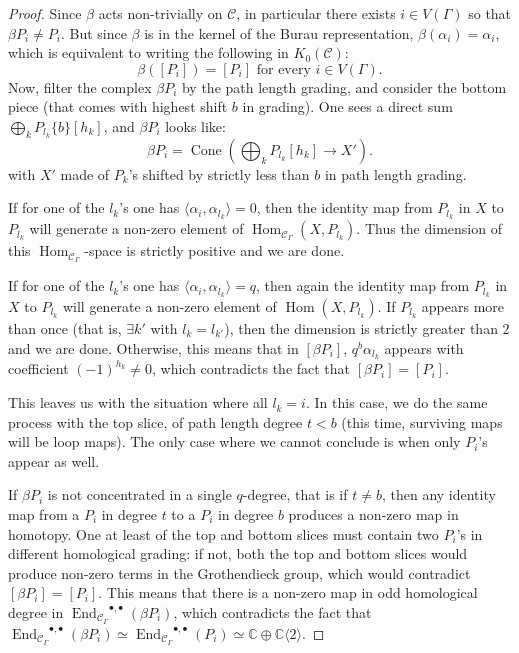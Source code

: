 \documentclass[a4paper]{amsart}
\newcommand{\C}{\mathbb{C}}
\newcommand{\0}{\mathbf{0}}
\newcommand{\calC}{\mathcal{C}}
\DeclareMathOperator{\Cone}{Cone}
\DeclareMathOperator{\Hom}{Hom}
\DeclareMathOperator{\End}{End}
\newcommand{\HOM}{\ensuremath{\Hom_{\mathcal{C}_\Gamma}}}
\newcommand{\END}{\ensuremath{\End_{\mathcal{C}_{\Gamma}}}}
\theoremstyle{theorem}
\begin{document}
\begin{proof}
  Since $\beta$ acts non-trivially on $\calC$, in particular there exists $i\in V(\Gamma)$ so that $\beta P_i\neq P_i$. But since $\beta$ is in the kernel of the Burau representation, $\beta(\alpha_i)=\alpha_i$, which is equivalent to writing the following in $K_0(\calC)$:
  \[
\beta([P_i])=[P_i] \text{ for every }i \in V(\Gamma).
\]
Now, filter the complex $\beta P_i$ by the path length grading, and consider the bottom piece (that comes with highest shift $b$ in grading). One sees a direct sum $\bigoplus_{k}P_{l_k}\{b\}[h_k]$, and $\beta P_i$ looks like:
\[
\beta P_i = \Cone\left(\bigoplus_k P_{l_k}[h_k]\rightarrow X'\right).
\]
with $X'$ made of $P_k$'s shifted by strictly less than $b$ in path length grading.

If for one of the $l_k$'s one has $\langle \alpha_i,\alpha_{l_k}\rangle=0$, then the identity map from $P_{l_k}$ in $X$ to $P_{l_k}$ will generate a non-zero element of $\HOM(X,P_{l_k})$. Thus the dimension of this $\HOM$-space is strictly positive and we are done.

If for one of the $l_k$'s one has $\langle \alpha_i,\alpha_{l_k}\rangle=q$, then again the identity map from $P_{l_k}$ in $X$ to $P_{l_k}$ will generate a non-zero element of $\Hom(X,P_{l_k})$. If $P_{l_k}$ appears more than once (that is, $\exists k'$ with $l_k=l_{k'}$), then the dimension is strictly greater than $2$ and we are done. Otherwise, this means that in $[\beta P_i]$, $q^{b}\alpha_{l_k}$ appears with coefficient $(-1)^{h_k}\neq 0$, which contradicts the fact that $[\beta P_i]=[P_i]$.

This leaves us with the situation where all $l_k=i$. In this case, we do the same process with the top slice, of path length degree $t<b$ (this time, surviving maps will be loop maps). The only case where we cannot conclude is when only $P_i$'s appear as well.

If $\beta P_i$ is not concentrated in a single $q$-degree, that is if $t\neq b$, then any identity map from a $P_i$ in degree $t$ to a $P_i$ in degree $b$ produces a non-zero map in homotopy. One at least of the top and bottom slices must contain two $P_i$'s in different homological grading: if not, both the top and bottom slices would produce non-zero terms in the Grothendieck group, which would contradict $[\beta P_i]=[P_i]$. This means that there is a non-zero map in odd homological degree in $\END^{\bullet,\bullet}(\beta P_i)$, which contradicts the fact that $\END^{\bullet,\bullet}(\beta P_i)\simeq\END^{\bullet,\bullet}(P_i)\simeq \C\oplus \C\langle 2\rangle$.


\end{proof}
\end{document}
